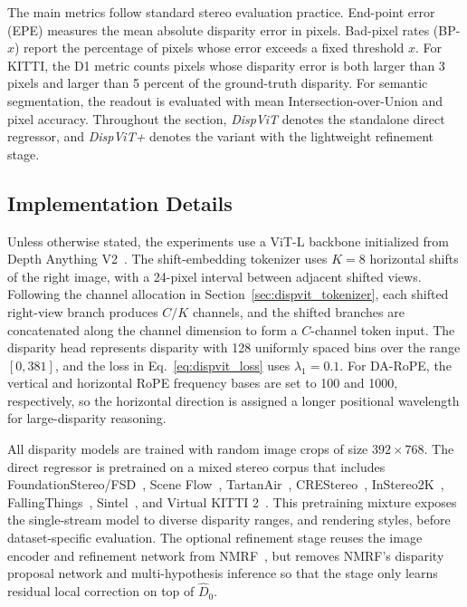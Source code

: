 The main metrics follow standard stereo evaluation practice.
End-point error (EPE) measures the mean absolute disparity error in pixels.
Bad-pixel rates (BP-$x$) report the percentage of pixels whose error exceeds a fixed threshold $x$.
For KITTI, the D1 metric counts pixels whose disparity error is both larger than 3 pixels and larger than 5 percent of the ground-truth disparity.
For semantic segmentation, the readout is evaluated with mean Intersection-over-Union and pixel accuracy.
Throughout the section, \emph{DispViT} denotes the standalone direct regressor, and \emph{DispViT+} denotes the variant with the lightweight refinement stage.

\subsection{Implementation Details}
\label{sec:dispvit_implementation}
Unless otherwise stated, the experiments use a ViT-L backbone initialized from Depth Anything V2~\cite{yang2024depth}.
The shift-embedding tokenizer uses $K=8$ horizontal shifts of the right image, with a 24-pixel interval between adjacent shifted views.
Following the channel allocation in Section~\ref{sec:dispvit_tokenizer}, each shifted right-view branch produces $C/K$ channels, and the shifted branches are concatenated along the channel dimension to form a $C$-channel token input.
The disparity head represents disparity with 128 uniformly spaced bins over the range $[0,381]$, and the loss in Eq.~\ref{eq:dispvit_loss} uses $\lambda_1=0.1$.
For DA-RoPE, the vertical and horizontal RoPE frequency bases are set to 100 and 1000, respectively, so the horizontal direction is assigned a longer positional wavelength for large-disparity reasoning.

All disparity models are trained with random image crops of size $392 \times 768$.
The direct regressor is pretrained on a mixed stereo corpus that includes FoundationStereo/FSD~\cite{wen2025foundationstereo}, Scene Flow~\cite{mayer2016large}, TartanAir~\cite{wang2020tartanair}, CREStereo~\cite{li2022practical}, InStereo2K~\cite{bao2020instereo2k}, FallingThings~\cite{tremblay2018falling}, Sintel~\cite{butler2012naturalistic}, and Virtual KITTI 2~\cite{cabon2020virtual}.
This pretraining mixture exposes the single-stream model to diverse disparity ranges, and rendering styles, before dataset-specific evaluation.
The optional refinement stage reuses the image encoder and refinement network from NMRF~\cite{guan2024neural}, but removes NMRF's disparity proposal network and multi-hypothesis inference so that the stage only learns residual local correction on top of $\hat{D}_0$.

